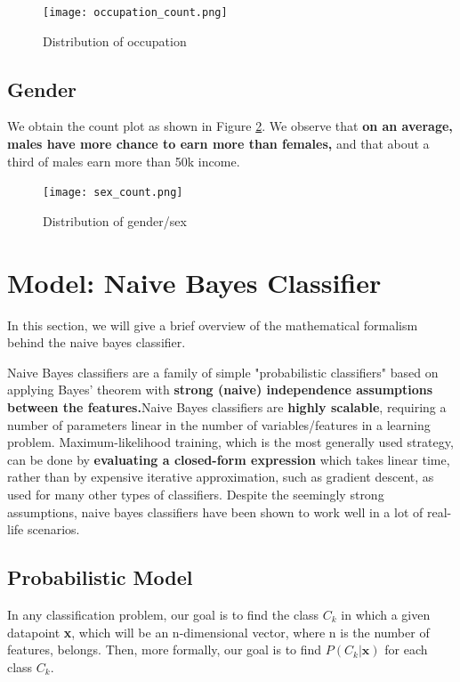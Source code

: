\documentclass[conference]{IEEEtran}
\begin{document}
\begin{figure}[tbh]
\centering
\texttt{[image: occupation\_count.png]}
\caption{Distribution of occupation }
\label{occupation_count}
\end{figure}

\subsection*{Gender}

We obtain the count plot as shown in Figure \ref{sex_count}. We observe that \textbf{on an average, males have more chance to earn more than females,} and that about a third of males earn more than 50k income.


\begin{figure}[tbh]
\centering
\texttt{[image: sex\_count.png]}
\caption{Distribution of gender/sex }
\label{sex_count}
\end{figure}

\section{Model: Naive Bayes Classifier}

In this section, we will give a brief overview of the mathematical formalism behind the naive bayes classifier. 

Naive Bayes classifiers are a family of simple "probabilistic classifiers" based on applying Bayes' theorem with \textbf{strong (naive) independence assumptions between the features.}Naive Bayes classifiers are \textbf{highly scalable}, requiring a number of parameters linear in the number of variables/features in a learning problem. Maximum-likelihood training, which is the most generally used strategy, can be done by \textbf{evaluating a closed-form expression} which takes linear time, rather than by expensive iterative approximation, such as gradient descent, as used for many other types of classifiers. Despite the seemingly strong assumptions, naive bayes classifiers have been shown to work well in a lot of real-life scenarios.

\subsection{Probabilistic Model}

In any classification problem, our goal is to find the class $C_k$ in which a given  datapoint \textbf{x}, which will be an n-dimensional vector, where n is the number of features, belongs. Then, more formally, our goal is to find $P(C_k|\mathbf{x})$ for each class $C_k$.
\end{document}
